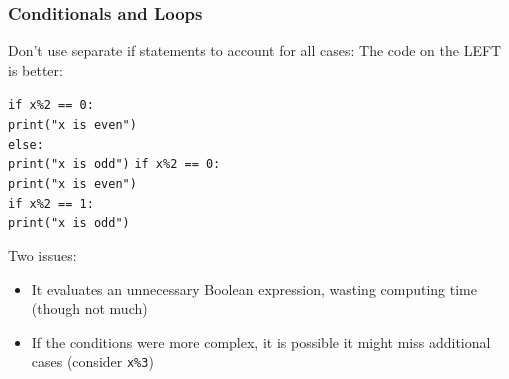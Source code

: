 \documentclass{beamer}
\newcommand{\code}[1]{\texttt{#1}}
\newcommand{\tab}{\hspace*{22pt}}
\begin{document}
\begin{frame}%
	\frametitle{Conditionals and Loops}
	
	\begin{block}{Don't use separate if statements to account for all cases:}
		The code on the LEFT is better:
		
		\vspace{15pt}
		
			\code{if x\%2 == 0: \\
					\tab print("x is even") \\
					else: \\
					\tab print("x is odd")}
		\endminipage\hfill
			\code{if x\%2 == 0: \\
					\tab print("x is even") \\
					if x\%2 == 1: \\
					\tab print("x is odd")}
		\endminipage\hfill
		
		\vspace{15pt}
		
		Two issues:
		\begin{itemize}
			\item It evaluates an unnecessary Boolean expression, wasting computing time (though not much)
			\item If the conditions were more complex, it is possible it might miss additional cases (consider \code{x\%3})
		\end{itemize}
	\end{block}
	
\end{frame}
\end{document}
